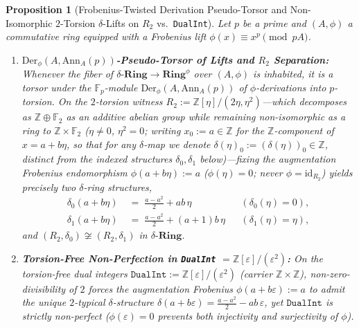 \documentclass[10pt,twoside,openright]{book}
\theoremstyle{crmplain}
\newtheorem{proposition}[theorem]{Proposition}
\theoremstyle{crmdef}
\theoremstyle{crmremark}
\begin{document}
\begin{proposition}[Frobenius-Twisted Derivation Pseudo-Torsor and Non-Isomorphic $2$-Torsion $\delta$-Lifts on $R_2$ vs.\ \texttt{DualInt}]\label{prop:r2-delta-torsor}%
%
Let $p$ be a prime and $(A, \phi)$ a commutative ring equipped with a Frobenius lift $\phi(x) \equiv x^p \pmod{pA}$.
\begin{enumerate}[label=\textup{(\roman*)},leftmargin=2.0em]
  \item \textbf{$\mathrm{Der}_\phi(A, \mathrm{Ann}_A(p))$-Pseudo-Torsor of Lifts and $R_2$ Separation:} Whenever the fiber of $\delta\text{-}\mathbf{Ring} \to \mathbf{Ring}^\phi$ over $(A, \phi)$ is inhabited, it is a torsor under the $\mathbb{F}_p$-module $\mathrm{Der}_\phi(A, \mathrm{Ann}_A(p))$ of $\phi$-derivations into $p$-torsion. On the $2$-torsion witness $R_2 := \mathbb{Z}[\eta]/(2\eta, \eta^2)$---which decomposes as $\mathbb{Z} \oplus \mathbb{F}_2$ as an additive abelian group while remaining non-isomorphic as a ring to $\mathbb{Z} \times \mathbb{F}_2$ ($\eta \neq 0$, $\eta^2 = 0$; writing $x_0 := a \in \mathbb{Z}$ for the $\mathbb{Z}$-component of $x = a + b\eta$, so that for any $\delta$-map we denote $\delta(\eta)_0 := (\delta(\eta))_0 \in \mathbb{Z}$, distinct from the indexed structures $\delta_0, \delta_1$ below)---fixing the \emph{augmentation Frobenius endomorphism} $\phi(a + b\eta) := a$ ($\phi(\eta) = 0$; never $\phi = \mathrm{id}_{R_2}$) yields \emph{precisely two} $\delta$-ring structures,
  \[
    \begin{aligned}
      \delta_0(a + b\eta) &\;=\; \frac{a - a^2}{2} + ab\,\eta &&(\delta_0(\eta) = 0), \\
      \delta_1(a + b\eta) &\;=\; \frac{a - a^2}{2} + (a+1)b\,\eta &&(\delta_1(\eta) = \eta),
    \end{aligned}
  \]
  and $(R_2, \delta_0) \not\cong (R_2, \delta_1)$ in $\delta\text{-}\mathbf{Ring}$.
  \item \textbf{Torsion-Free Non-Perfection in \texttt{DualInt} $= \mathbb{Z}[\varepsilon]/(\varepsilon^2)$:} On the torsion-free dual integers $\mathtt{DualInt} := \mathbb{Z}[\varepsilon]/(\varepsilon^2)$ (carrier $\mathbb{Z} \times \mathbb{Z}$), non-zero-divisibility of $2$ forces the augmentation Frobenius $\phi(a + b\varepsilon) := a$ to admit the \emph{unique} $2$-typical $\delta$-structure $\delta(a + b\varepsilon) = \frac{a - a^2}{2} - ab\,\varepsilon$, yet $\mathtt{DualInt}$ is strictly non-perfect ($\phi(\varepsilon) = 0$ prevents both injectivity and surjectivity of $\phi$).
\end{enumerate}
\end{proposition}
\end{document}
